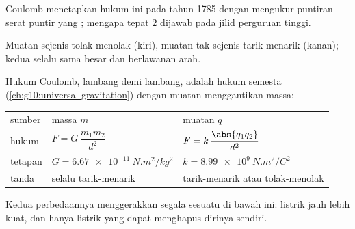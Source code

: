 \begin{remark}\label{rem:g11:fundamental-interactions:torsion}
Coulomb menetapkan hukum ini pada tahun 1785 dengan mengukur puntiran
serat puntir yang ; mengapa  tepat $2$ dijawab pada
jilid perguruan tinggi.
\end{remark}

\begin{omfigure}
\qquad
{}

{\small Muatan sejenis tolak-menolak (kiri), muatan tak sejenis
tarik-menarik (kanan); kedua  selalu sama besar dan berlawanan
arah.}
\end{omfigure}

\begin{remark}\label{rem:g11:fundamental-interactions:twin}
Hukum Coulomb, lambang demi lambang, adalah hukum  semesta
(\cref{ch:g10:universal-gravitation}) dengan muatan menggantikan massa:
\begin{center}
\begin{tabular}{lll}
sumber & massa $m$ & muatan $q$ \\
hukum & $F = G\,\dfrac{m_1 m_2}{d^2}$ & $F = k\,\dfrac{\abs{q_1 q_2}}{d^2}$ \\[1.5ex]
tetapan & $G = \qty{6.67e-11}{N.m^2/kg^2}$ & $k = \qty{8.99e9}{N.m^2/C^2}$ \\
tanda & selalu tarik-menarik & tarik-menarik atau tolak-menolak \\
\end{tabular}
\end{center}
Kedua perbedaannya menggerakkan segala sesuatu di bawah ini: listrik
jauh lebih kuat, dan hanya listrik yang dapat menghapus dirinya sendiri.
\end{remark}

